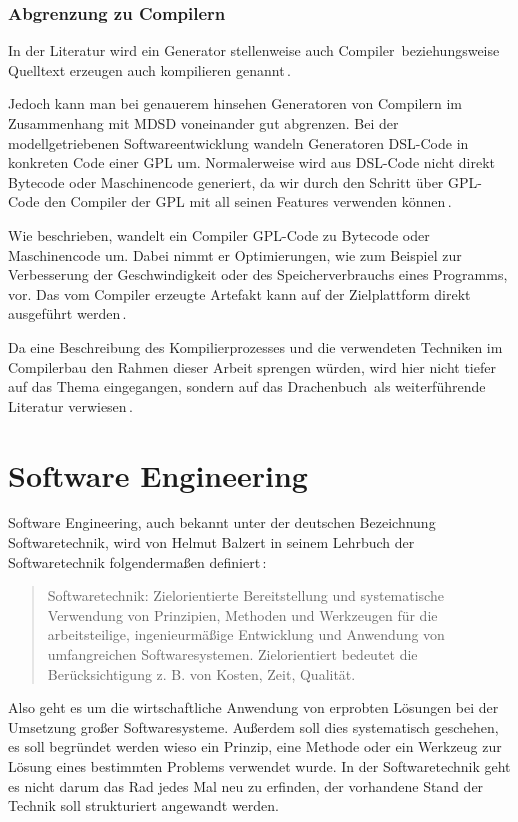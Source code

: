 \documentclass[12pt,oneside,a4paper,parskip]{scrbook}
\begin{document}
\subsubsection{Abgrenzung zu Compilern}

In der Literatur wird ein Generator stellenweise auch Compiler\,\cite[S. 26]{voelter2013} beziehungsweise Quelltext erzeugen auch kompilieren genannt\,\cite[S. 19]{fowler2010}.

Jedoch kann man bei genauerem hinsehen Generatoren von Compilern im Zusammenhang mit MDSD voneinander gut abgrenzen. Bei der modellgetriebenen Softwareentwicklung wandeln Generatoren DSL-Code in konkreten Code einer GPL um. Normalerweise wird aus DSL-Code nicht direkt Bytecode oder Maschinencode generiert, da wir durch den Schritt über GPL-Code den Compiler der GPL mit all seinen Features verwenden können\,\cite[S. 11]{voelter2013}.
	
Wie beschrieben, wandelt ein Compiler GPL-Code zu Bytecode oder Maschinencode um. Dabei nimmt er Optimierungen, wie zum Beispiel zur Verbesserung der Geschwindigkeit oder des Speicherverbrauchs eines Programms, vor. Das vom Compiler erzeugte Artefakt kann auf der Zielplattform direkt ausgeführt werden\,\cite[S. 345ff.]{czaeis2000}.
	
Da eine Beschreibung des Kompilierprozesses und die verwendeten Techniken im Compilerbau den Rahmen dieser Arbeit sprengen würden, wird hier nicht tiefer auf das Thema eingegangen, sondern auf das \glqq Drachenbuch\grqq\ als weiterführende Literatur verwiesen\,\cite{aho2006}.

\section{Software Engineering}

Software Engineering, auch bekannt unter der deutschen Bezeichnung Softwaretechnik, wird von Helmut Balzert in seinem Lehrbuch der Softwaretechnik folgendermaßen definiert\,\cite[S.17]{balzert2009a}:

\begin{quote}
	Softwaretechnik: Zielorientierte Bereitstellung und systematische Verwendung von Prinzipien, Methoden und Werkzeugen für	die arbeitsteilige, ingenieurmäßige Entwicklung und Anwendung von umfangreichen Softwaresystemen. Zielorientiert bedeutet die	Berücksichtigung z. B. von Kosten, Zeit, Qualität.
\end{quote}

Also geht es um die wirtschaftliche Anwendung von erprobten Lösungen bei der Umsetzung großer Softwaresysteme. Außerdem soll dies systematisch geschehen, es soll begründet werden wieso ein Prinzip, eine Methode oder ein Werkzeug zur Lösung eines bestimmten Problems verwendet wurde. In der Softwaretechnik geht es nicht darum das Rad jedes Mal neu zu erfinden, der vorhandene Stand der Technik soll strukturiert angewandt werden.
\end{document}
